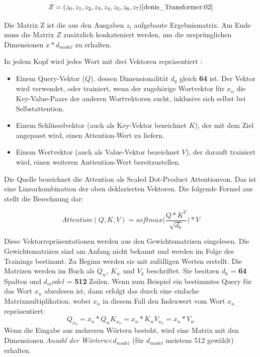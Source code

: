 \begin{equation}
	Z = (z_0, z_1, z_2, z_3, z_4, z_5, z_6, z_7) \cite{denis_Transformer:02}
\end{equation}

Die Matrix Z ist die aus den Ausgaben $z_i$ aufgebaute Ergebnismatrix. Am Ende muss die Matrix $Z$ zusätzlich konkateniert werden, um die ursprünglichen Dimensionen $x*d_{model}$ zu erhalten.

In jedem Kopf wird jedes Wort mit drei Vektoren repräsentiert \cite{transfered_learning:22}:
\begin{itemize}
	\item Einem Query-Vektor ($Q$), dessen Dimensionalität $d_q$ gleich \textbf{64} ist. Der Vektor wird verwendet, oder trainiert, wenn der zugehörige Wortvektor für $x_n$ die Key-Value-Paare der anderen Wortvektoren sucht, inklusive sich selbst bei Selbstattention.
	
	\item Einem Schlüsselvektor (auch als Key-Vektor bezeichnet $K$), der mit dem Ziel angepasst wird, einen Attention-Wert zu liefern.
	
	\item Einem Wertvektor (auch als Value-Vektor bezeichnet $V$), der darauft trainiert wird, einen weiteren Anttention-Wert bereitzustellen.
\end{itemize}

Die Quelle \cite{denis_Transformer:02} bezeichnet die Attention als \text{\quotedblbase}Scaled Dot-Product Attentionvon. Das ist eine Linearkombination der oben deklarierten Vektoren. Die folgende Formel aus \cite{denis_Transformer:02} stellt die Berechnung dar: 

\begin{equation}
	Attention(Q, K, V) = softmax\Bigg(\frac{Q*K^T}{\sqrt{d_k}}\Bigg)* V
\end{equation}

Diese Vektorrepräsentationen werden aus den Gewichtsmatrizen eingelesen. Die Gewichtsmatrizen sind am Anfang nicht bekannt und werden im Folge des Trainings bestimmt. Zu Beginn werden sie mit zufälligen Werten erstellt. Die Matrizen werden im Buch \cite{denis_Transformer:02} als $Q_w$, $K_w$ und $V_k$ beschriftet. Sie besitzen $d_k$ = \textbf{64} Spalten und $d_model$ = \textbf{512} Zeilen. Wenn zum Beispiel ein bestimmtes Query für das Wort $x_n$ abzulesen ist, dann erfolgt das durch eine einfache Matrixmultiplikation, wobei $x_n$ in diesem Fall den Indexwert vom Wort $x_n$ repräsentiert:
\begin{subequations}
\begin{equation}
	Q_{x_n} = x_n * Q_w
\end{equation}
\begin{equation}
	K_{x_n} = x_n * K_w
\end{equation}
\begin{equation}
	V_{x_n} = x_n * V_w
\end{equation}
\end{subequations}
Wenn die Eingabe aus mehreren Wörtern besteht, wird eine Matrix mit den Dimensionen \textit{Anzahl der Wörtern}$\times d_{model}$ (für $d_{model}$ meistens 512 gewählt) erhalten.

